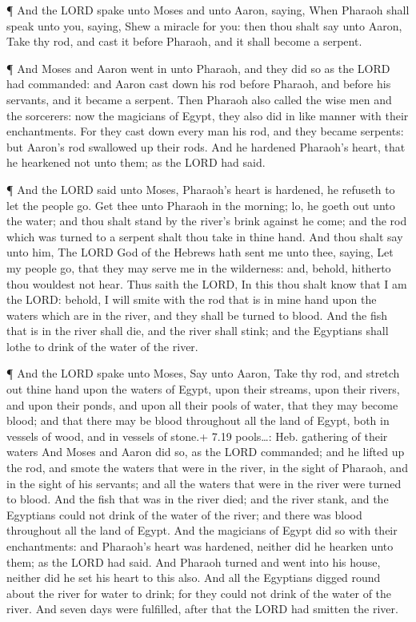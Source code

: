  ¶ And the LORD spake unto Moses and unto Aaron, saying,
 When Pharaoh shall speak unto you, saying, Shew a miracle
for you: then thou shalt say unto Aaron, Take thy rod, and cast it
before Pharaoh, and it shall become a serpent.

 ¶ And Moses and Aaron went in unto Pharaoh, and they did
so as the LORD had commanded: and Aaron cast down his rod before
Pharaoh, and before his servants, and it became a serpent. 
Then Pharaoh also called the wise men and the sorcerers: now the
magicians of Egypt, they also did in like manner with their
enchantments.  For they cast down every man his rod, and
they became serpents: but Aaron's rod swallowed up their rods.
 And he hardened Pharaoh's heart, that he hearkened not
unto them; as the LORD had said.

 ¶ And the LORD said unto Moses, Pharaoh's heart is
hardened, he refuseth to let the people go.  Get thee unto
Pharaoh in the morning; lo, he goeth out unto the water; and thou shalt
stand by the river's brink against he come; and the rod which was turned
to a serpent shalt thou take in thine hand.  And thou shalt
say unto him, The LORD God of the Hebrews hath sent me unto thee,
saying, Let my people go, that they may serve me in the wilderness: and,
behold, hitherto thou wouldest not hear.  Thus saith the
LORD, In this thou shalt know that I am the LORD: behold, I will smite
with the rod that is in mine hand upon the waters which are in the
river, and they shall be turned to blood.  And the fish
that is in the river shall die, and the river shall stink; and the
Egyptians shall lothe to drink of the water of the river.

 ¶ And the LORD spake unto Moses, Say unto Aaron, Take thy
rod, and stretch out thine hand upon the waters of Egypt, upon their
streams, upon their rivers, and upon their ponds, and upon all their
pools of water, that they may become blood; and that there may be blood
throughout all the land of Egypt, both in vessels of wood, and in
vessels of stone.+ 7.19 pools\ldots: Heb. gathering of their waters
 And Moses and Aaron did so, as the LORD commanded; and he
lifted up the rod, and smote the waters that were in the river, in the
sight of Pharaoh, and in the sight of his servants; and all the waters
that were in the river were turned to blood.  And the fish
that was in the river died; and the river stank, and the Egyptians could
not drink of the water of the river; and there was blood throughout all
the land of Egypt.  And the magicians of Egypt did so with
their enchantments: and Pharaoh's heart was hardened, neither did he
hearken unto them; as the LORD had said.  And Pharaoh
turned and went into his house, neither did he set his heart to this
also.  And all the Egyptians digged round about the river
for water to drink; for they could not drink of the water of the river.
 And seven days were fulfilled, after that the LORD had
smitten the river.

